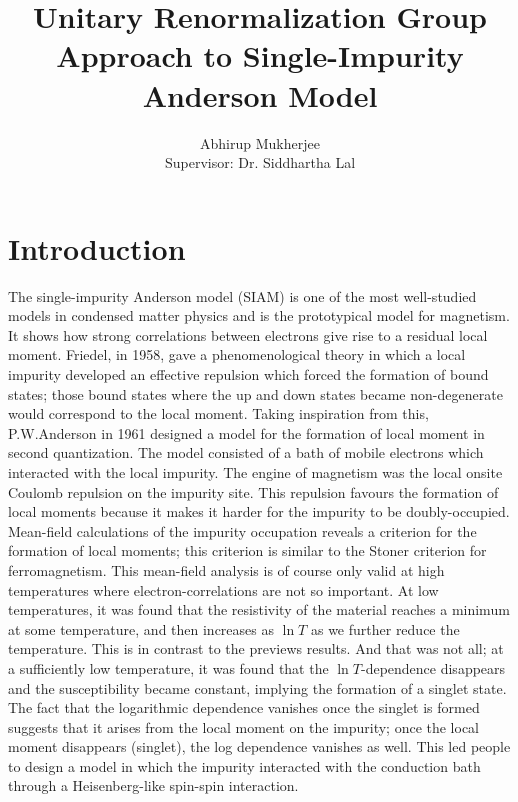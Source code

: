 \documentclass[14pt]{extarticle}
\numberwithin{equation}{section}
\begin{document}
\title{Unitary Renormalization Group Approach to Single-Impurity Anderson Model}
\author{Abhirup Mukherjee\\[5pt]{Supervisor: Dr. Siddhartha Lal}}
\maketitle
\pagebreak
\tableofcontents
\pagebreak
\section*{Introduction}
The single-impurity Anderson model (SIAM) is one of the most well-studied models in condensed matter physics and is the prototypical model for magnetism.
It shows how strong correlations between electrons give rise to a residual local moment.
Friedel\cite{Friedel}, in 1958, gave a phenomenological theory in which a local impurity developed an effective repulsion which forced the formation of bound states; those bound states where the up and down states became non-degenerate would correspond to the local moment.
Taking inspiration from this, P.W.Anderson\cite{Anderson} in 1961 designed a model for the formation of local moment in second quantization.
The model consisted of a bath of mobile electrons which interacted with the local impurity.
The engine of magnetism was the local onsite Coulomb repulsion on the impurity site.
This repulsion favours the formation of local moments because it makes it harder for the impurity to be doubly-occupied.
\pb Mean-field calculations of the impurity occupation reveals a criterion for the formation of local moments; this criterion is similar to the Stoner criterion for ferromagnetism. This mean-field analysis is of course only valid at high temperatures where electron-correlations are not so important. At low temperatures, it was found that the resistivity of the material reaches a minimum at some temperature, and then increases as \(\ln T\) as we further reduce the temperature. This is in contrast to the previews results. And that was not all; at a sufficiently low temperature, it was found that the \(\ln T\)-dependence disappears and the susceptibility became constant, implying the formation of a singlet state.
\pb The fact that the logarithmic dependence vanishes once the singlet is formed suggests that it arises from the local moment on the impurity; once the local moment disappears (singlet), the log dependence vanishes as well.
This led people to design a model in which the impurity interacted with the conduction bath through a Heisenberg-like spin-spin interaction.
\end{document}
